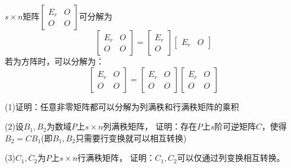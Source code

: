 \begin{theorem}[矩阵分解]
  $s \times n$矩阵$\left[
    \begin{array}{cc}
      E_r & O\\
      O & O
    \end{array}
  \right]$可分解为
  \begin{equation*}
    \left[
      \begin{array}{cc}
        E_r&O\\
        O&O
      \end{array}
    \right] = \left[
      \begin{array}{c}
        E_r\\
        O
      \end{array}
    \right] \left[
      \begin{array}{cc}
        E_r&O
      \end{array}
    \right]
  \end{equation*}
  若为方阵时，可以分解为：
  \begin{equation*}
    \left[
      \begin{array}{cc}
        E_r&O\\
        O&O
      \end{array}
    \right]
    = 
    \left[
      \begin{array}{cc}

        E_r&O\\
        O&O
      \end{array}
    \right]
    \left[
      \begin{array}{cc}
        E_r&O\\
        O&O
      \end{array}
    \right]
  \end{equation*}
\end{theorem}


\begin{exercise}[行列满秩分解]
  (1)证明：任意非零矩阵都可以分解为列满秩和行满秩矩阵的乘积

  (2)设$B_1,B_2$为数域$P$上$s \times n$列满秩矩阵，
  证明：存在$P$上$s$阶可逆矩阵$C$，使得$B_2 = CB_1$(即$B_1,B_2$只需要行变换就可以相互转换)

  (3)$C_1,C_2$为$P$上$s \times n$行满秩矩阵，
  证明：$C_1,C_2$可以仅通过列变换相互转换。
\end{exercise}

